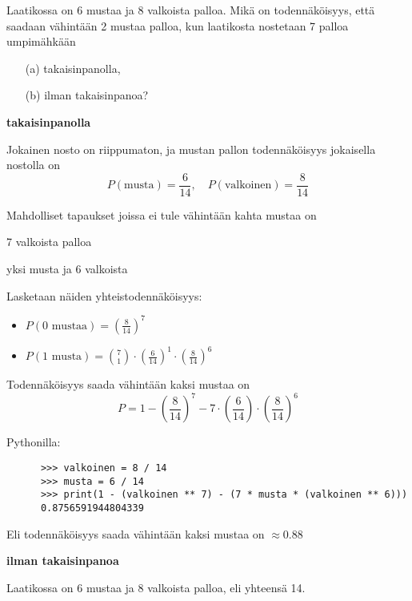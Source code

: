 \documentclass[12pt,a4paper]{article}
\begin{document}
\newpage
{}
Laatikossa on 6 mustaa ja 8 valkoista palloa. Mikä on
todennäköisyys, että saadaan vähintään 2 mustaa palloa, kun 
laatikosta nostetaan 7 palloa umpimähkään
\begin{enumerate}
\item[(a)] takaisinpanolla,
\item[(b)] ilman takaisinpanoa?
\end{enumerate}

\begin{kohta}

  \item \textbf{takaisinpanolla}

  Jokainen nosto on riippumaton, ja mustan pallon todennäköisyys jokaisella nostolla on
  \[
  P(\text{musta}) = \frac{6}{14}, \quad P(\text{valkoinen}) = \frac{8}{14}
  \]

  Mahdolliset tapaukset joissa ei tule vähintään kahta mustaa on
  \begin{alakohta}
    \item 7 valkoista palloa
    \item yksi musta ja 6 valkoista
  \end{alakohta}

  Lasketaan näiden yhteistodennäköisyys:

  \begin{itemize}
    \item $P(\text{0 mustaa}) = \left(\frac{8}{14}\right)^7$
    \item $P(\text{1 musta}) = \binom{7}{1} \cdot \left(\frac{6}{14}\right)^1 \cdot \left(\frac{8}{14}\right)^6$
  \end{itemize}

  Todennäköisyys saada vähintään kaksi mustaa on
  \[
  P = 1 - \left(\frac{8}{14}\right)^7 - 7 \cdot \left(\frac{6}{14}\right) \cdot \left(\frac{8}{14}\right)^6
  \]

    Pythonilla:
    \begin{verbatim}
      >>> valkoinen = 8 / 14
      >>> musta = 6 / 14
      >>> print(1 - (valkoinen ** 7) - (7 * musta * (valkoinen ** 6)))
      0.8756591944804339
    \end{verbatim}
Eli todennäköisyys saada vähintään kaksi mustaa on $\approx 0.88$




\pagebreak
  \item \textbf{ilman takaisinpanoa}

  Laatikossa on 6 mustaa ja 8 valkoista palloa, eli yhteensä 14.


\end{kohta}
\end{document}

